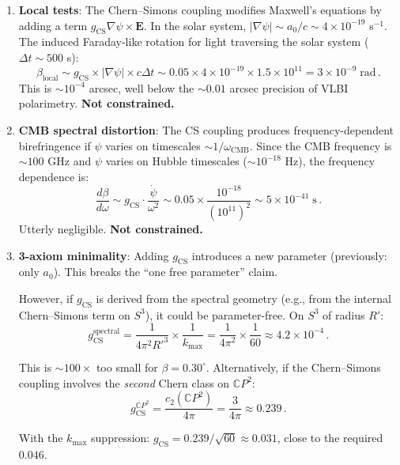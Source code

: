 \documentclass[11pt,a4paper]{article}
\newcommand{\CP}{\mathbb{C}P}
\begin{document}
\begin{enumerate}
\item \textbf{Local tests}: The Chern--Simons coupling modifies Maxwell's equations by adding a term $g_{\mathrm{CS}}\nabla\psi \times \mathbf{E}$. In the solar system, $|\nabla\psi| \sim a_0/c \sim 4 \times 10^{-19}$ s$^{-1}$. The induced Faraday-like rotation for light traversing the solar system ($\Delta t \sim 500$ s):
\begin{equation}
\beta_{\mathrm{local}} \sim g_{\mathrm{CS}} \times |\nabla\psi| \times c\Delta t \sim 0.05 \times 4 \times 10^{-19} \times 1.5 \times 10^{11} = 3 \times 10^{-9}\;\mathrm{rad}\,.
\end{equation}
This is $\sim 10^{-4}$ arcsec, well below the $\sim 0.01$ arcsec precision of VLBI polarimetry. \textbf{Not constrained.}

\item \textbf{CMB spectral distortion}: The CS coupling produces frequency-dependent birefringence if $\psi$ varies on timescales $\sim 1/\omega_{\mathrm{CMB}}$. Since the CMB frequency is $\sim 100$ GHz and $\psi$ varies on Hubble timescales ($\sim 10^{-18}$ Hz), the frequency dependence is:
\begin{equation}
\frac{d\beta}{d\omega} \sim g_{\mathrm{CS}} \cdot \frac{\dot{\psi}}{\omega^2} \sim 0.05 \times \frac{10^{-18}}{(10^{11})^2} \sim 5 \times 10^{-41}\;\mathrm{s}\,.
\end{equation}
Utterly negligible. \textbf{Not constrained.}

\item \textbf{3-axiom minimality}: Adding $g_{\mathrm{CS}}$ introduces a new parameter (previously: only $a_0$). This breaks the ``one free parameter'' claim.

However, if $g_{\mathrm{CS}}$ is derived from the spectral geometry (e.g., from the internal Chern--Simons term on $S^3$), it could be parameter-free. On $S^3$ of radius $R'$:
\begin{equation}
g_{\mathrm{CS}}^{\mathrm{spectral}} = \frac{1}{4\pi^2 R'^3} \times \frac{1}{k_{\max}} = \frac{1}{4\pi^2} \times \frac{1}{60} \approx 4.2 \times 10^{-4}\,.
\end{equation}

This is $\sim 100\times$ too small for $\beta = 0.30^\circ$. Alternatively, if the Chern--Simons coupling involves the \emph{second} Chern class on $\CP^2$:
\begin{equation}
g_{\mathrm{CS}}^{\CP^2} = \frac{c_2(\CP^2)}{4\pi} = \frac{3}{4\pi} \approx 0.239\,.
\end{equation}

With the $k_{\max}$ suppression: $g_{\mathrm{CS}} = 0.239/\sqrt{60} \approx 0.031$, close to the required $0.046$.
\end{enumerate}
\end{document}
